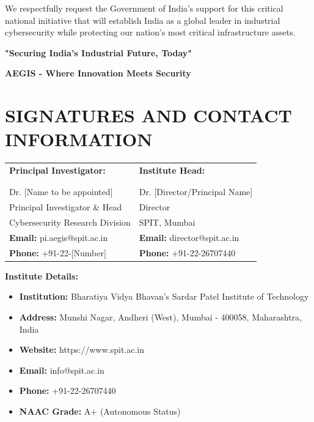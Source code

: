 \documentclass[12pt,a4paper]{article}
\begin{document}
We respectfully request the Government of India's support for this critical national initiative that will establish India as a global leader in industrial cybersecurity while protecting our nation's most critical infrastructure assets.

\vspace{2cm}

\begin{center}
\textbf{"Securing India's Industrial Future, Today"}

\vspace{0.5cm}

\textbf{AEGIS - Where Innovation Meets Security}
\end{center}

\newpage

\section*{SIGNATURES AND CONTACT INFORMATION}

\vspace{1cm}

\begin{tabular}{p{7cm}p{7cm}}

\textbf{Principal Investigator:} & \textbf{Institute Head:} \\
\vspace{2cm} & \vspace{2cm} \\
\hrulefill & \hrulefill \\
Dr. [Name to be appointed] & Dr. [Director/Principal Name] \\
Principal Investigator \& Head & Director \\
Cybersecurity Research Division & SPIT, Mumbai \\
\textbf{Email:} pi.aegis@spit.ac.in & \textbf{Email:} director@spit.ac.in \\
\textbf{Phone:} +91-22-[Number] & \textbf{Phone:} +91-22-26707440 \\

\end{tabular}

\vspace{2cm}

\textbf{Institute Details:}
\begin{itemize}
    \item \textbf{Institution:} Bharatiya Vidya Bhavan's Sardar Patel Institute of Technology
    \item \textbf{Address:} Munshi Nagar, Andheri (West), Mumbai - 400058, Maharashtra, India
    \item \textbf{Website:} https://www.spit.ac.in
    \item \textbf{Email:} info@spit.ac.in
    \item \textbf{Phone:} +91-22-26707440
    \item \textbf{NAAC Grade:} A+ (Autonomous Status)
\end{itemize}
\end{document}
